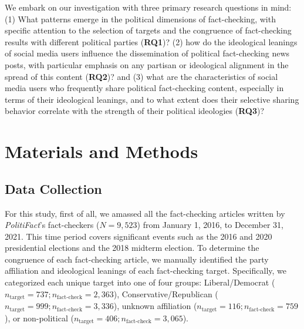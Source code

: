 \documentclass[
  12pt,
]{article}
\begin{document}
We embark on our investigation with three primary research questions in
mind: (1) What patterns emerge in the political dimensions of
fact-checking, with specific attention to the selection of targets and
the congruence of fact-checking results with different political parties
(\textbf{RQ1})? (2) how do the ideological leanings of social media
users influence the dissemination of political fact-checking news posts,
with particular emphasis on any partisan or ideological alignment in the
spread of this content (\textbf{RQ2})? and (3) what are the
characteristics of social media users who frequently share political
fact-checking content, especially in terms of their ideological
leanings, and to what extent does their selective sharing behavior
correlate with the strength of their political ideologies
(\textbf{RQ3})?

\hypertarget{materials-and-methods}{%
\section{Materials and Methods}\label{materials-and-methods}}

\hypertarget{data-collection}{%
\subsection{Data Collection}\label{data-collection}}

For this study, first of all, we amassed all the fact-checking articles
written by \emph{PolitiFact}'s fact-checkers (\(N = 9,523\)) from
January 1, 2016, to December 31, 2021. This time period covers
significant events such as the 2016 and 2020 presidential elections and
the 2018 midterm election. To determine the congruence of each
fact-checking article, we manually identified the party affiliation and
ideological leanings of each fact-checking target. Specifically, we
categorized each unique target into one of four groups: Liberal/Democrat
(\(n_{\text{target}} = 737; n_{\text{fact-check}} = 2,363\)),
Conservative/Republican
(\(n_{\text{target}} = 999; n_{\text{fact-check}} = 3,336\)), unknown
affiliation (\(n_{\text{target}} = 116; n_{\text{fact-check}} = 759\)),
or non-political
(\(n_{\text{target}} = 406; n_{\text{fact-check}} = 3,065\)).
\end{document}
